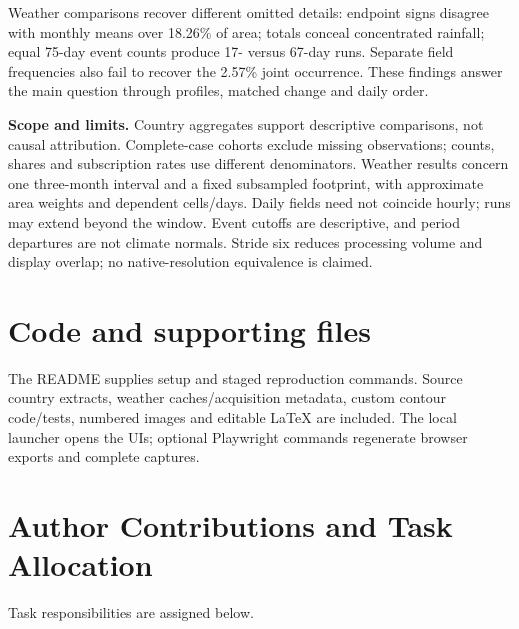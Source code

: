 \documentclass[conference,a4paper]{IEEEtran}
\begin{document}
Weather comparisons recover different omitted details: endpoint signs disagree with monthly means over 18.26\% of area; totals conceal concentrated rainfall; equal 75-day event counts produce 17- versus 67-day runs. Separate field frequencies also fail to recover the 2.57\% joint occurrence. These findings answer the main question through profiles, matched change and daily order.



\textbf{Scope and limits.} Country aggregates support descriptive comparisons, not causal attribution. Complete-case cohorts exclude missing observations; counts, shares and subscription rates use different denominators. Weather results concern one three-month interval and a fixed subsampled footprint, with approximate area weights and dependent cells/days. Daily fields need not coincide hourly; runs may extend beyond the window. Event cutoffs are descriptive, and period departures are not climate normals. Stride six reduces processing volume and display overlap; no native-resolution equivalence is claimed.



\section{Code and supporting files}

The README supplies setup and staged reproduction commands. Source country extracts, weather caches/acquisition metadata, custom contour code/tests, numbered images and editable LaTeX are included. The local launcher opens the UIs; optional Playwright commands regenerate browser exports and complete captures.



\section*{Author Contributions and Task Allocation}
Task responsibilities are assigned below.
\par\smallskip{}\par\smallskip
\end{document}
